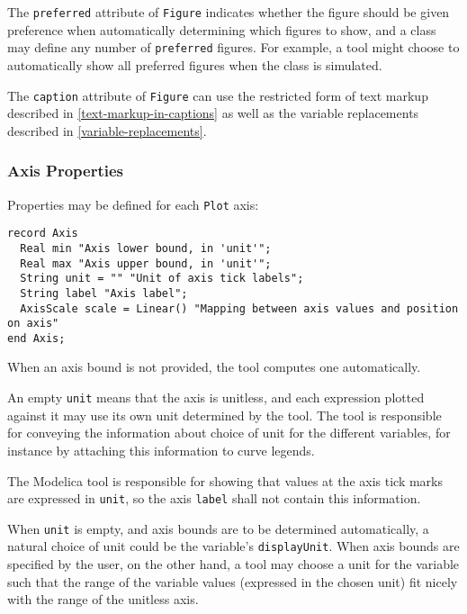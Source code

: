 The \lstinline!preferred! attribute of \lstinline!Figure! indicates whether the figure should be given preference when automatically determining which figures to show,
and a class may define any number of \lstinline!preferred! figures.  For example, a tool might choose to automatically show all preferred figures when the class is simulated.

The \lstinline!caption! attribute of \lstinline!Figure! can use the restricted
form of text markup described in \cref{text-markup-in-captions} as well as
the variable replacements described in \cref{variable-replacements}.

\subsubsection{Axis Properties}\label{axis-properties}

Properties may be defined for each \lstinline!Plot! axis:
\begin{lstlisting}[language=modelica]
record Axis
  Real min "Axis lower bound, in 'unit'";
  Real max "Axis upper bound, in 'unit'";
  String unit = "" "Unit of axis tick labels";
  String label "Axis label";
  AxisScale scale = Linear() "Mapping between axis values and position on axis"
end Axis;
\end{lstlisting}

When an axis bound is not provided, the tool computes one automatically.

An empty \lstinline!unit! means that the axis is unitless, and each expression plotted against it may use its own unit determined by the tool.  The tool is responsible for conveying the information
about choice of unit for the different variables, for instance by attaching this information to curve legends.

The Modelica tool is responsible for showing that values at the axis tick marks are expressed in \lstinline!unit!, so the axis \lstinline!label! shall not contain this information.

\begin{nonnormative}
When \lstinline!unit! is empty, and axis bounds are to be determined automatically, a natural choice of unit could be the variable's \lstinline!displayUnit!.  When axis bounds are specified by the
user, on the other hand, a tool may choose a unit for the variable such that the range of the variable values (expressed in the chosen unit) fit nicely with the range of the unitless axis.
\end{nonnormative}

